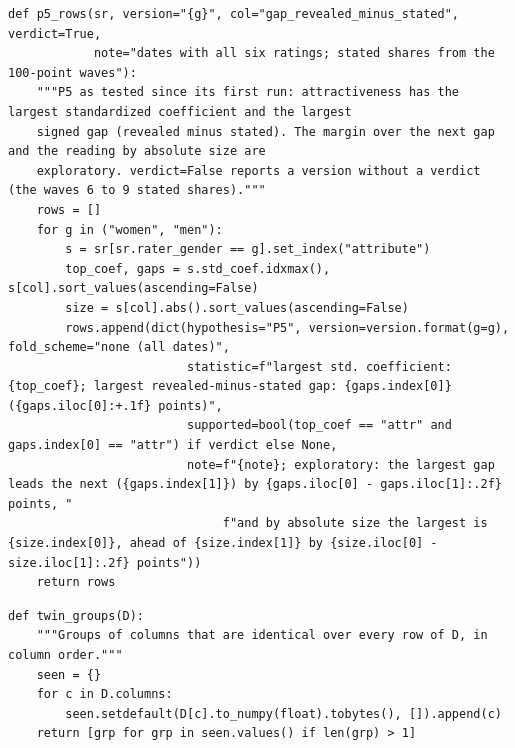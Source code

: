 \documentclass[11pt]{article}
\begin{document}
\begin{lstlisting}[caption={How P5 is decided (scripts/part1\_models.py)}]
def p5_rows(sr, version="{g}", col="gap_revealed_minus_stated", verdict=True,
            note="dates with all six ratings; stated shares from the 100-point waves"):
    """P5 as tested since its first run: attractiveness has the largest standardized coefficient and the largest
    signed gap (revealed minus stated). The margin over the next gap and the reading by absolute size are
    exploratory. verdict=False reports a version without a verdict (the waves 6 to 9 stated shares)."""
    rows = []
    for g in ("women", "men"):
        s = sr[sr.rater_gender == g].set_index("attribute")
        top_coef, gaps = s.std_coef.idxmax(), s[col].sort_values(ascending=False)
        size = s[col].abs().sort_values(ascending=False)
        rows.append(dict(hypothesis="P5", version=version.format(g=g), fold_scheme="none (all dates)",
                         statistic=f"largest std. coefficient: {top_coef}; largest revealed-minus-stated gap: {gaps.index[0]} ({gaps.iloc[0]:+.1f} points)",
                         supported=bool(top_coef == "attr" and gaps.index[0] == "attr") if verdict else None,
                         note=f"{note}; exploratory: the largest gap leads the next ({gaps.index[1]}) by {gaps.iloc[0] - gaps.iloc[1]:.2f} points, "
                              f"and by absolute size the largest is {size.index[0]}, ahead of {size.index[1]} by {size.iloc[0] - size.iloc[1]:.2f} points"))
    return rows
\end{lstlisting}

\begin{lstlisting}[caption={Identical columns (scripts/part1\_models.py)}]
def twin_groups(D):
    """Groups of columns that are identical over every row of D, in column order."""
    seen = {}
    for c in D.columns:
        seen.setdefault(D[c].to_numpy(float).tobytes(), []).append(c)
    return [grp for grp in seen.values() if len(grp) > 1]
\end{lstlisting}
\end{document}
